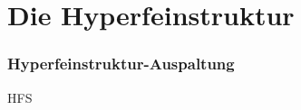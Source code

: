\section{Die Hyperfeinstruktur}


\begin{frame}
\frametitle{Hyperfeinstruktur-Auspaltung}
  HFS
\end{frame}

